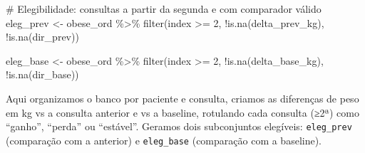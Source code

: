 \documentclass[
]{article}
\newenvironment{Shaded}{\begin{snugshade}}{\end{snugshade}}
\newcommand{\CommentTok}[1]{\textcolor[rgb]{0.37,0.37,0.37}{#1}}
\newcommand{\DecValTok}[1]{\textcolor[rgb]{0.68,0.00,0.00}{#1}}
\newcommand{\FunctionTok}[1]{\textcolor[rgb]{0.28,0.35,0.67}{#1}}
\newcommand{\NormalTok}[1]{\textcolor[rgb]{0.00,0.23,0.31}{#1}}
\newcommand{\OtherTok}[1]{\textcolor[rgb]{0.00,0.23,0.31}{#1}}
\newcommand{\SpecialCharTok}[1]{\textcolor[rgb]{0.37,0.37,0.37}{#1}}
\begin{document}
\begin{Shaded}
\begin{Highlighting}[]
\CommentTok{\# Elegibilidade: consultas a partir da segunda e com comparador válido}
\NormalTok{ eleg\_prev }\OtherTok{\textless{}{-}}\NormalTok{ obese\_ord }\SpecialCharTok{\%\textgreater{}\%}
  \FunctionTok{filter}\NormalTok{(index }\SpecialCharTok{\textgreater{}=} \DecValTok{2}\NormalTok{, }\SpecialCharTok{!}\FunctionTok{is.na}\NormalTok{(delta\_prev\_kg), }\SpecialCharTok{!}\FunctionTok{is.na}\NormalTok{(dir\_prev))}

\NormalTok{ eleg\_base }\OtherTok{\textless{}{-}}\NormalTok{ obese\_ord }\SpecialCharTok{\%\textgreater{}\%}
  \FunctionTok{filter}\NormalTok{(index }\SpecialCharTok{\textgreater{}=} \DecValTok{2}\NormalTok{, }\SpecialCharTok{!}\FunctionTok{is.na}\NormalTok{(delta\_base\_kg), }\SpecialCharTok{!}\FunctionTok{is.na}\NormalTok{(dir\_base))}
\end{Highlighting}
\end{Shaded}

Aqui organizamos o banco por paciente e consulta, criamos as diferenças
de peso em kg vs a consulta anterior e vs a baseline, rotulando cada
consulta (≥2ª) como ``ganho'', ``perda'' ou ``estável''. Geramos dois
subconjuntos elegíveis: \texttt{eleg\_prev} (comparação com a anterior)
e \texttt{eleg\_base} (comparação com a baseline).
\end{document}
